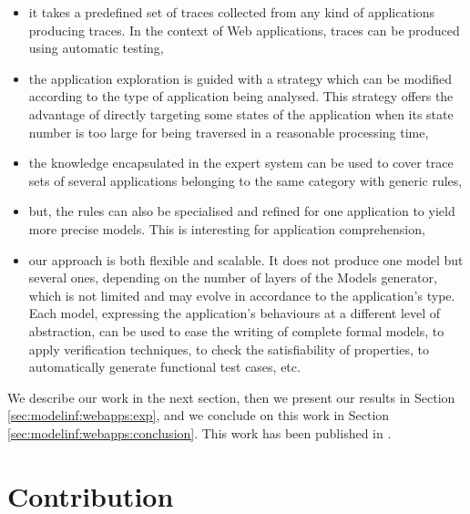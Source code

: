 \begin{itemize}
\item it takes a predefined set of traces collected from any kind
of applications producing traces. In the context of Web
applications, traces can be produced using automatic testing,

\item the application exploration is guided with a strategy which
can be modified according to the type of application being
analysed. This strategy offers the advantage of directly targeting
some states of the application when its state number is too large
for being traversed in a reasonable processing time,

\item the knowledge encapsulated in the expert system can be used
to cover trace sets of several applications belonging to the same
category with generic rules,

\item but, the rules can also be specialised and refined for one
application to yield more precise models. This is interesting for
application comprehension,

\item our approach is both flexible and scalable. It does not
produce one model but several ones, depending on the number of
layers of the Models generator, which is not limited and may
evolve in accordance to the application's type. Each model,
expressing the application's behaviours at a different level of
abstraction, can be used to ease the writing of complete formal
models, to apply verification techniques, to check the
satisfiability of properties, to automatically generate
functional test cases, etc.
\end{itemize}

We describe our work in the next section, then we present our
results in Section \ref{sec:modelinf:webapps:exp}, and we
conclude on this work in Section
\ref{sec:modelinf:webapps:conclusion}. This work has been
published in \cite{DBLP:conf/soict/DurandS14}.


\section{Contribution}
\label{sec:modelinf:webapps:contrib}

